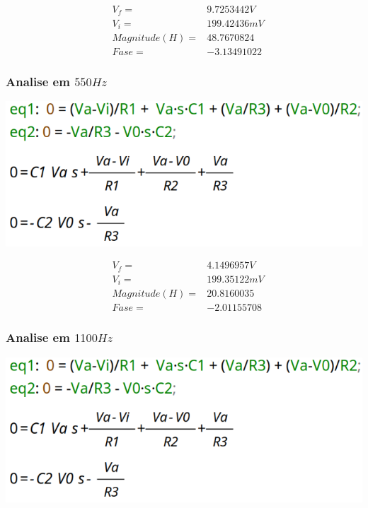\documentclass[12pt,twoside, a4paper, twocolumn]{article}
\begin{document}
\begin{equation*}
    \begin{aligned}
         & V_f =          & 9.7253442V  \\
         & V_i =          & 199.42436mV \\
         & Magnitude(H) = & 48.7670824  \\
         & Fase =         & -3.13491022
    \end{aligned}
\end{equation*}


\subsubsection{Analise em $550Hz$}


\begin{adjustbox}{scale=0.09}
    \includegraphics{eqs.png}
\end{adjustbox}


\begin{equation*}
    \begin{aligned}
         & V_f =          & 4.1496957V  \\
         & V_i =          & 199.35122mV \\
         & Magnitude(H) = & 20.8160035  \\
         & Fase =         & -2.01155708
    \end{aligned}
\end{equation*}


\subsubsection{Analise em $1100Hz$}


\begin{adjustbox}{scale=0.09}
    \includegraphics{eqs.png}
\end{adjustbox}
\end{document}
